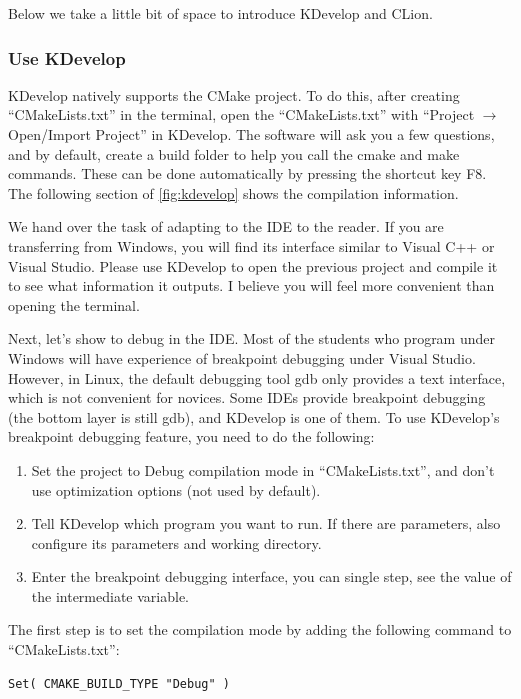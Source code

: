 Below we take a little bit of space to introduce KDevelop and CLion.

\subsubsection{Use KDevelop}
KDevelop natively supports the CMake project. To do this, after creating ``CMakeLists.txt'' in the terminal, open the ``CMakeLists.txt'' with ``Project $\rightarrow$Open/Import Project'' in KDevelop. The software will ask you a few questions, and by default, create a build folder to help you call the cmake and make commands. These can be done automatically by pressing the shortcut key F8. The following section of \autoref{fig:kdevelop} shows the compilation information.

We hand over the task of adapting to the IDE to the reader. If you are transferring from Windows, you will find its interface similar to Visual C++ or Visual Studio. Please use KDevelop to open the previous project and compile it to see what information it outputs. I believe you will feel more convenient than opening the terminal.

Next, let's show to debug in the IDE. Most of the students who program under Windows will have experience of breakpoint debugging under Visual Studio. However, in Linux, the default debugging tool gdb only provides a text interface, which is not convenient for novices. Some IDEs provide breakpoint debugging (the bottom layer is still gdb), and KDevelop is one of them. To use KDevelop's breakpoint debugging feature, you need to do the following:

\begin{enumerate}
    \item Set the project to Debug compilation mode in ``CMakeLists.txt'', and don't use optimization options (not used by default).
    \item Tell KDevelop which program you want to run. If there are parameters, also configure its parameters and working directory.
    \item Enter the breakpoint debugging interface, you can single step, see the value of the intermediate variable.
\end{enumerate}


The first step is to set the compilation mode by adding the following command to ``CMakeLists.txt'':
\begin{lstlisting}[caption=slambook2/ch2/CMakeLists.txt]
Set( CMAKE_BUILD_TYPE "Debug" )
\end{lstlisting}

